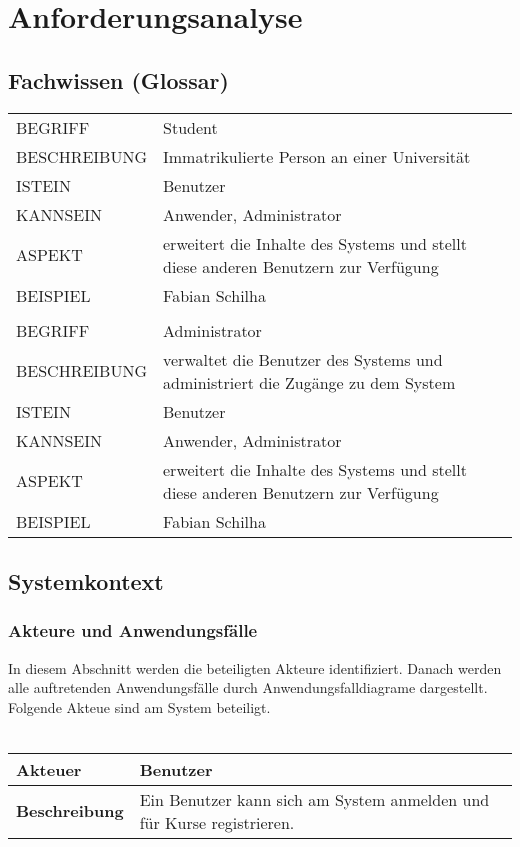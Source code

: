 \documentclass[12pt,a4paper]{article}
\begin{document}
\section{Anforderungsanalyse}
\subsection{Fachwissen (Glossar)}
\begin{tabular}{l l} 
BEGRIFF & Student \\ 
BESCHREIBUNG & Immatrikulierte Person an einer Universität \\ 
ISTEIN & Benutzer \\
KANNSEIN & Anwender, Administrator \\ 
ASPEKT & erweitert die Inhalte des Systems und stellt diese anderen Benutzern zur Verfügung \\
BEISPIEL & Fabian Schilha\\

&\\ 

BEGRIFF & Administrator \\ 
BESCHREIBUNG & verwaltet die Benutzer des Systems und administriert die Zugänge zu dem System \\ 
ISTEIN & Benutzer \\
KANNSEIN & Anwender, Administrator \\ 
ASPEKT & erweitert die Inhalte des Systems und stellt diese anderen Benutzern zur Verfügung \\
BEISPIEL & Fabian Schilha\\
\end{tabular}


\subsection{Systemkontext}
\subsubsection{Akteure und Anwendungsfälle}
In diesem Abschnitt werden die beteiligten Akteure identifiziert. Danach werden alle auftretenden Anwendungsfälle durch Anwendungsfalldiagrame dargestellt.
Folgende Akteue sind am System beteiligt.\\\\

\begin{tabular}{l p{10cm}}
\textbf{Akteuer} & Benutzer \\ 
\hline \textbf{Beschreibung} & Ein Benutzer kann sich am System anmelden und für Kurse registrieren. \\ 
\hline 
\end{tabular}\\\\
\end{document}
